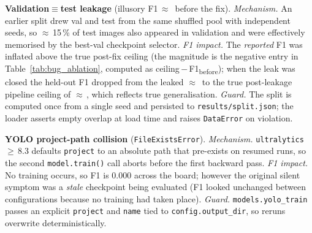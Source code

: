 \item \textbf{Validation$\equiv$test leakage}
  (illusory F1\,$\approx$\, before the fix).
  \textit{Mechanism.} An earlier split drew val and test from the same
  shuffled pool with independent seeds, so $\approx$\,15\,\% of test
  images also appeared in validation and were effectively memorised
  by the best-val checkpoint selector.  \textit{F1 impact.} The
  \emph{reported} F1 was inflated above the true post-fix ceiling
  (the magnitude is the negative entry in
  Table~\ref{tab:bug_ablation}, computed as
  ceiling\,$-$\,F1\textsubscript{before}); when the leak was closed
  the held-out F1 dropped from the leaked
  $\approx$\, to the true post-leakage
  pipeline ceiling of $\approx$\,, which reflects
  true generalisation.  \textit{Guard.} The split is
  computed once from a single seed and persisted to
  \texttt{results/split.json}; the loader asserts empty overlap at
  load time and raises \texttt{DataError} on violation.

\item \textbf{YOLO project-path collision} (\texttt{FileExistsError}).
  \textit{Mechanism.} \texttt{ultralytics}\,$\geq$\,8.3 defaults
  \texttt{project} to an absolute path that pre-exists on resumed
  runs, so the second \texttt{model.train()} call aborts before the
  first backward pass.  \textit{F1 impact.} No training occurs, so
  F1 is 0.000 across the board; however the original silent symptom
  was a \emph{stale} checkpoint being evaluated (F1 looked
  unchanged between configurations because no training had taken
  place).  \textit{Guard.} \texttt{models.yolo\_train} passes an
  explicit \texttt{project} and \texttt{name} tied to
  \texttt{config.output\_dir}, so reruns overwrite deterministically.

